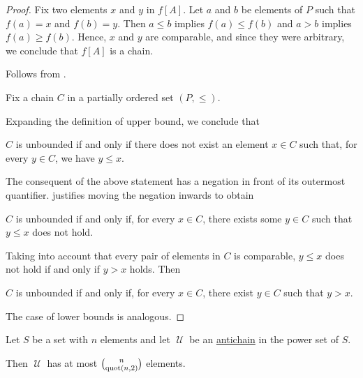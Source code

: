 \begin{proof}
   Fix two elements \( x \) and \( y \) in \( f[A] \). Let \( a \) and \( b \) be elements of \( P \) such that \( f(a) = x \) and \( f(b) = y \). Then \( a \leq b \) implies \( f(a) \leq f(b) \) and \( a > b \) implies \( f(a) \geq f(b) \). Hence, \( x \) and \( y \) are comparable, and since they were arbitrary, we conclude that \( f[A] \) is a chain.

   Follows from .

   Fix a chain \( C \) in a partially ordered set \( (P, \leq) \).

  Expanding the definition  of upper bound, we conclude that
  \begin{displayquote}
    \( C \) is unbounded if and only if there does not exist an element \( x \in C \) such that, for every \( y \in C \), we have \( y \leq x \).
  \end{displayquote}

  The consequent of the above statement has a negation in front of its outermost quantifier.  justifies moving the negation inwards to obtain
  \begin{displayquote}
    \( C \) is unbounded if and only if, for every \( x \in C \), there exists some \( y \in C \) such that \( y \leq x \) does not hold.
  \end{displayquote}

  Taking into account that every pair of elements in \( C \) is comparable, \( y \leq x \) does not hold if and only if \( y > x \) holds. Then
  \begin{displayquote}
    \( C \) is unbounded if and only if, for every \( x \in C \), there exist \( y \in C \) such that \( y > x \).
  \end{displayquote}

  The case of lower bounds is analogous.
\end{proof}

\begin{theorem}\label{thm:sperners_theorem}
  Let \( S \) be a set with \( n \) elements and let \( \mscrU \) be an \hyperref[def:partial_order_chain/antichain]{antichain} in the power set of \( S \).

  Then \( \mscrU \) has at most \( \binom n {\operatorname{quot}(n, 2)} \) elements.
\end{theorem}

